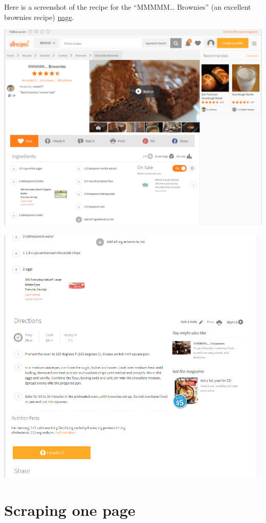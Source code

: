 \documentclass[
  12pt,
]{book}
\begin{document}
Here is a screenshot of the recipe for the ``MMMMM\ldots{} Brownies'' (an excellent brownies recipe) \href{https://www.allrecipes.com/recipe/25080/mmmmm-brownies/?internalSource=hub\%20recipe\&referringContentType=Search}{page}.

\includegraphics{images/brownies_1.PNG}

\includegraphics{images/brownies_2.PNG}

\hypertarget{scraping-one-page}{%
\section{Scraping one page}\label{scraping-one-page}}
\end{document}
